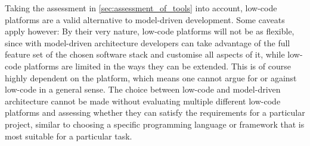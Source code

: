 \documentclass[runningheads]{llncs}
\begin{document}
Taking the assessment in \cref{sec:assessment_of_tools} into account, low-code platforms are a valid alternative to model-driven development. Some caveats apply however: By their very nature, low-code platforms will not be as flexible, since with model-driven architecture developers can take advantage of the full feature set of the chosen software stack and customise all aspects of it, while low-code platforms are limited in the ways they can be extended. This is of course highly dependent on the platform, which means one cannot argue for or against low-code in a general sense. The choice between low-code and model-driven architecture cannot be made without evaluating multiple different low-code platforms and assessing whether they can satisfy the requirements for a particular project, similar to choosing a specific programming language or framework that is most suitable for a particular task.

\newpage
\printbibliography
\end{document}
